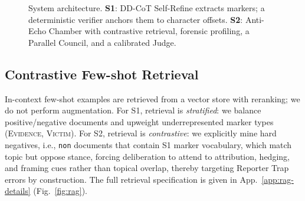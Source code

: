 \documentclass[11pt]{article}
\begin{document}
\begin{figure}[t]
    \vspace{-4pt}
    \caption{System architecture. \textbf{S1}: DD-CoT Self-Refine extracts markers; a deterministic verifier anchors them to character offsets. \textbf{S2}: Anti-Echo Chamber with contrastive retrieval, forensic profiling, a Parallel Council, and a calibrated Judge.}
    \label{fig:arch}
    \vspace{-8pt}
\end{figure}


\subsection{Contrastive Few-shot Retrieval}
\label{sec:contrastive-rag}
In-context few-shot examples are retrieved from a vector store with reranking; we do not perform augmentation. For S1, retrieval is \emph{stratified}: we balance positive/negative documents and upweight underrepresented marker types (\textsc{Evidence}, \textsc{Victim}). For S2, retrieval is \emph{contrastive}: we explicitly mine hard negatives, i.e., \texttt{non} documents that contain S1 marker vocabulary, which match topic but oppose stance, forcing deliberation to attend to attribution, hedging, and framing cues rather than topical overlap, thereby targeting Reporter Trap errors by construction. The full retrieval specification is given in App.~\ref{app:rag-details} (Fig.~\ref{fig:rag}).
\end{document}
